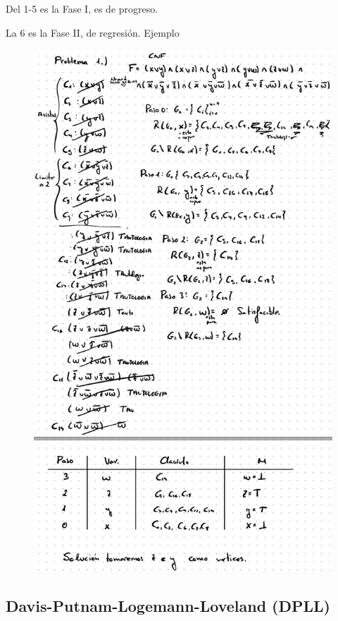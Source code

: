 \documentclass[12pt, twoside, openright]{report} %
\begin{document}
    Del 1-5 es la Fase I, es de progreso.

	La 6 es la Fase II, de regresión.
\pagebreak
    Ejemplo
	\begin{figure}[H]
		{\includegraphics[scale=.4]{Untitled 33.png}}
	\end{figure}

	
\subsection{Davis-Putnam-Logemann-Loveland (DPLL)}
\end{document}
